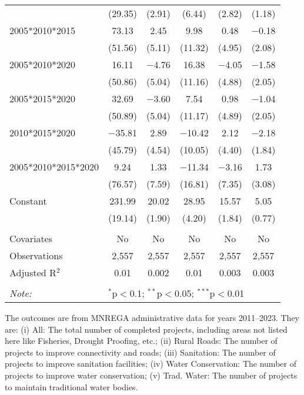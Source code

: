 \begin{table}[!htbp]
\begin{threeparttable}
\begin{tabular}{@{\extracolsep{0pt}}lccccc}
  & (29.35) & (2.91) & (6.44) & (2.82) & (1.18) \\ 
  2005*2010*2015 & 73.13 & 2.45 & 9.98 & 0.48 & $-$0.18 \\ 
  & (51.56) & (5.11) & (11.32) & (4.95) & (2.08) \\ 
  2005*2010*2020 & 16.11 & $-$4.76 & 16.38 & $-$4.05 & $-$1.58 \\ 
  & (50.86) & (5.04) & (11.16) & (4.88) & (2.05) \\ 
  2005*2015*2020 & 32.69 & $-$3.60 & 7.54 & 0.98 & $-$1.04 \\ 
  & (50.89) & (5.04) & (11.17) & (4.89) & (2.05) \\ 
  2010*2015*2020 & $-$35.81 & 2.89 & $-$10.42 & 2.12 & $-$2.18 \\ 
  & (45.79) & (4.54) & (10.05) & (4.40) & (1.84) \\ 
  2005*2010*2015*2020 & 9.24 & 1.33 & $-$11.34 & $-$3.16 & 1.73 \\ 
  & (76.57) & (7.59) & (16.81) & (7.35) & (3.08) \\ 
  Constant & 231.99 & 20.02 & 28.95 & 15.57 & 5.05 \\ 
  & (19.14) & (1.90) & (4.20) & (1.84) & (0.77) \\ 
 \hline \\[-1.8ex] 
Covariates & No & No & No & No & No \\ 
Observations & 2,557 & 2,557 & 2,557 & 2,557 & 2,557 \\ 
Adjusted R$^{2}$ & 0.01 & 0.002 & 0.01 & 0.003 & 0.003 \\ 
\hline 
\hline \\[-1.8ex] 
\textit{Note:}  & \multicolumn{5}{l}{$^{*}$p$<$0.1; $^{**}$p$<$0.05; $^{***}$p$<$0.01} \\ 
\end{tabular} 
\begin{tablenotes}[flushleft]
\scriptsize
\item The outcomes are from MNREGA administrative data for years 2011--2023. They are: 
(i) All: The total number of completed projects, including areas not listed here like Fisheries, Drought Proofing, etc.;
(ii) Rural Roads: The number of projects to improve connectivity and roads;
(iii) Sanitation: The number of projects to improve sanitation facilities;
(iv) Water Conservation: The number of projects to improve water conservation;
(v) Trad. Water: The number of projects to maintain traditional water bodies.
\end{tablenotes}
\end{threeparttable}
\end{table}
